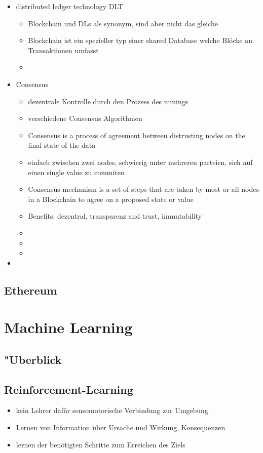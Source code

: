 \begin{itemize}
    \item distributed ledger technology DLT
    \begin{itemize}
        \item Blockchain und DLs als synonym, sind aber nicht das gleiche
        \item Blockchain ist ein spezieller typ einer shared Database welche Blöcke an Transaktionen umfasst
        \item 
    \end{itemize}
    \item Consensus 
    \begin{itemize}
        \item dezentrale Kontrolle durch den Prozess des minings
        \item verschiedene Consensus Algorithmen
        \item Consensus is a process of agreement between distrusting nodes on the final state of the data
        \item einfach zwischen zwei nodes, schwierig unter mehreren parteien, sich auf einen single value zu commiten 
        \item Consensus mechanism is a set of steps that are taken by most or all nodes in a Blockchain to agree on a proposed state or value
        \item Benefits: dezentral, transparenz and trust, immutability
        \item 
        \item 
        \item 
    \end{itemize}
    \item 
\end{itemize}
\subsection{Ethereum}

%
\section{Machine Learning}
\subsection{"Uberblick}
\subsection{Reinforcement-Learning}
\begin{itemize}
    \item kein Lehrer dafür sensomotorische Verbindung zur Umgebung
    \item Lernen von Information über Ursache und Wirkung, Konsequenzen
    \item lernen der benötigten Schritte zum Erreichen des Ziels
\end{itemize}

